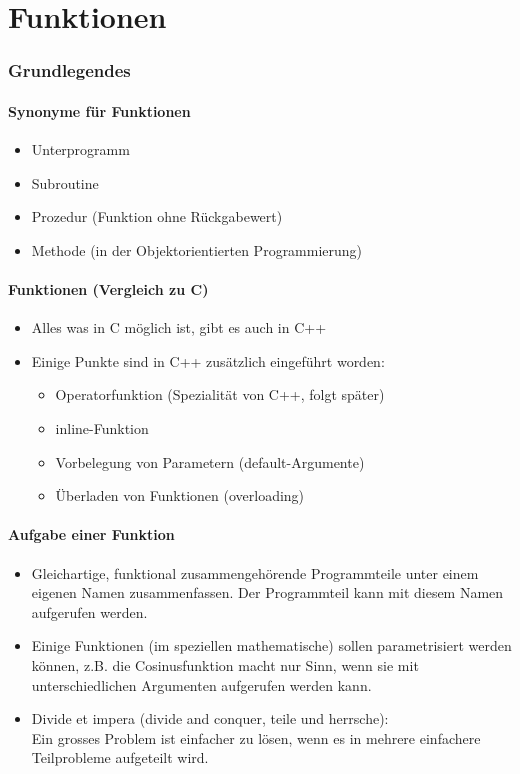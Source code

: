 
\part{Funktionen}

\section{Grundlegendes}

\begin{multicols}{2}
\subsection{Synonyme für Funktionen}
\begin{itemize}
	\item Unterprogramm
	\item Subroutine
	\item Prozedur (Funktion ohne Rückgabewert)
	\item Methode (in der Objektorientierten Programmierung)
\end{itemize}
\vfill\null
\columnbreak
\subsection{Funktionen (Vergleich zu C)}
\begin{itemize}
	\item Alles was in C möglich ist, gibt es auch in C++
	\item Einige Punkte sind in C++ zusätzlich eingeführt worden:
	\begin{itemize}
		\item Operatorfunktion (Spezialität von C++, folgt später)
		\item inline-Funktion
		\item Vorbelegung von Parametern (default-Argumente)
		\item Überladen von Funktionen (overloading)
	\end{itemize}
\end{itemize}
\end{multicols}

\subsection{Aufgabe einer Funktion}
\begin{itemize}
	\item Gleichartige, funktional zusammengehörende Programmteile unter einem eigenen Namen zusammenfassen. Der Programmteil kann mit diesem Namen aufgerufen werden.
	\item Einige Funktionen (im speziellen mathematische) sollen parametrisiert werden können, z.B. die Cosinusfunktion macht nur Sinn, wenn sie mit unterschiedlichen Argumenten aufgerufen werden kann.
	\item Divide et impera (divide and conquer, teile und herrsche):\\
	Ein grosses Problem ist einfacher zu lösen, wenn es in mehrere einfachere Teilprobleme aufgeteilt wird.
\end{itemize}



